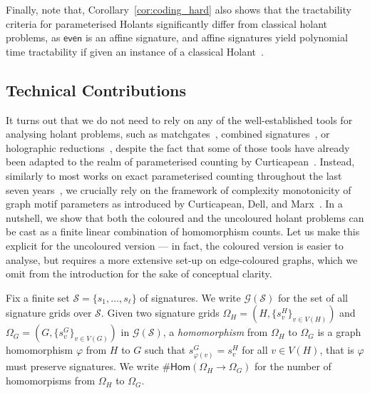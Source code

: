 \documentclass[authorcolumns,numberwithinsect]{no-lipics-v2022}
\newcommand{\homs}[2]{\mathsf{Hom}(#1 \to #2)}
\begin{document}
Finally, note that, Corollary~\ref{cor:coding_hard} also shows that the tractability criteria for parameterised Holants significantly differ from classical holant problems, as $\mathsf{even}$ is an affine signature, and affine signatures yield polynomial time tractability if given an instance of a classical Holant~\cite{ParityHolant13}.

\subsection{Technical Contributions}
It turns out that we do not need to rely on any of the well-established tools for analysing holant problems, such as matchgates~\cite{CaiC07}, combined signatures~\cite{CurticapeanX15}, or holographic reductions~\cite{Valiant08,CaiL11}, despite the fact that some of those tools have already been adapted to the realm of parameterised counting by Curticapean~\cite{Curticapean15}.
Instead, similarly to most works on exact parameterised counting throughout the last seven years~\cite{Roth17,DellRW19,RothSW20,BressanR21,BLR2023stoc,DoringMW24,CurticapeanN24,DoringMW25}, we crucially rely on the framework of complexity monotonicity of graph motif parameters as introduced by Curticapean, Dell, and Marx~\cite{CurticapeanDM17}. In a nutshell, we show that both the coloured and the uncoloured holant problems can be cast as a finite linear combination of homomorphism counts. Let us make this explicit for the uncoloured version --- in fact, the coloured version is easier to analyse, but requires a more extensive set-up on edge-coloured graphs, which we omit from the introduction for the sake of conceptual clarity.

Fix a finite set $\mathcal{S}=\{s_1,\dots,s_\ell\}$ of signatures. We write $\mathcal{G}(\mathcal{S})$ for the set of all signature grids over $\mathcal{S}$. Given two signature grids $\Omega_H=(H,\{s^H_v\}_{v\in V(H)})$ and $\Omega_G=(G,\{s^G_v\}_{v\in V(G)})$ in $\mathcal{G}(\mathcal{S})$, a \emph{homomorphism} from $\Omega_H$ to $\Omega_G$ is a graph homomorphism $\varphi$ from $H$ to $G$ such that $s^G_{\varphi(v)}=s^H_v$ for all $v\in V(H)$, that is $\varphi$ must preserve signatures. We write $\#\homs{\Omega_H}{\Omega_G}$ for the number of homomorpisms from $\Omega_H$ to $\Omega_G$.
\end{document}

